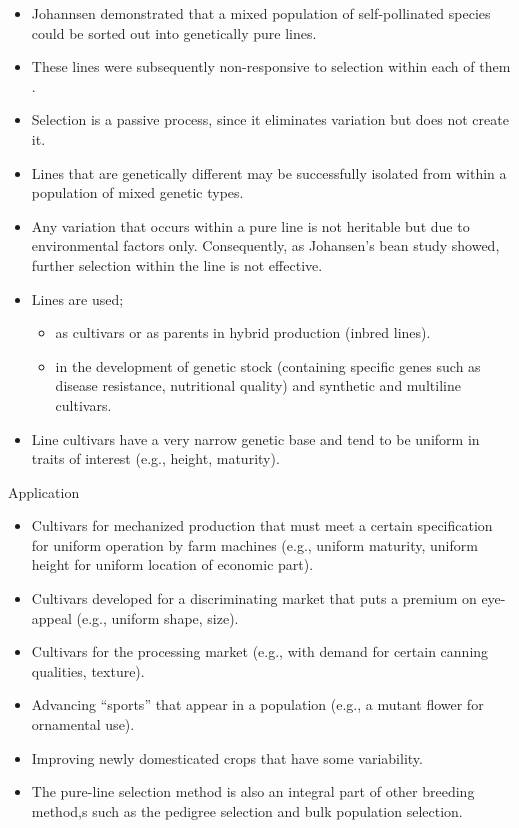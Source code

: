 \documentclass[11pt,ignorenonframetext,aspectratio=169]{beamer}
\providecommand{\tightlist}{%
  \setlength{\itemsep}{0pt}\setlength{\parskip}{0pt}}
\begin{document}
\begin{frame}{}
\protect\hypertarget{section-6}{}
\begin{itemize}
\tightlist
\item
  Johannsen demonstrated that a mixed population of self-pollinated
  species could be sorted out into genetically pure lines.
\item
  These lines were subsequently non-responsive to selection within each
  of them .
\item
  Selection is a passive process, since it eliminates variation but does
  not create it.
\item
  Lines that are genetically different may be successfully isolated from
  within a population of mixed genetic types.
\item
  Any variation that occurs within a pure line is not heritable but due
  to environmental factors only. Consequently, as Johansen's bean study
  showed, further selection within the line is not effective.
\item
  Lines are used;

  \begin{itemize}
  \tightlist
  \item
    as cultivars or as parents in hybrid production (inbred lines).
  \item
    in the development of genetic stock (containing specific genes such
    as disease resistance, nutritional quality) and synthetic and
    multiline cultivars.
  \end{itemize}
\item
  Line cultivars have a very narrow genetic base and tend to be uniform
  in traits of interest (e.g., height, maturity).
\end{itemize}
\end{frame}

\begin{frame}{Application}
\protect\hypertarget{application}{}
\begin{itemize}
\tightlist
\item
  Cultivars for mechanized production that must meet a certain
  specification for uniform operation by farm machines (e.g., uniform
  maturity, uniform height for uniform location of economic part).
\item
  Cultivars developed for a discriminating market that puts a premium on
  eye-appeal (e.g., uniform shape, size).
\item
  Cultivars for the processing market (e.g., with demand for certain
  canning qualities, texture).
\item
  Advancing ``sports'' that appear in a population (e.g., a mutant
  flower for ornamental use).
\item
  Improving newly domesticated crops that have some variability.
\item
  The pure-line selection method is also an integral part of other
  breeding method,s such as the pedigree selection and bulk population
  selection.
\end{itemize}
\end{frame}
\end{document}
